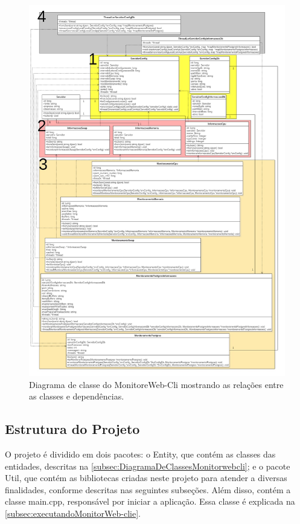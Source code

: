 \begin{figure}[H]
	\centering
	\includegraphics[width=1.0\textwidth]{figuras/Cli-Diagrama.jpg}
	\caption[Diagrama de classe do MonitoreWeb-Cli.]{Diagrama de classe do MonitoreWeb-Cli mostrando as relações entre as classes e dependências.}
	\label{Img:Cli-Diagrama}
\end{figure}


\subsection{Estrutura do Projeto}\label{}

O projeto é dividido em dois pacotes: o Entity, que contém as classes das entidades, descritas na \autoref{subsec:DiagramaDeClassesMonitorwebcli}; e o pacote Util, que contém as bibliotecas criadas neste projeto para atender a diversas finalidades, conforme descritas nas seguintes subseções. Além disso, contém a classe main.cpp, responsável por iniciar a aplicação. Essa classe é explicada na \autoref{subsec:executandoMonitorWeb-clie}.


